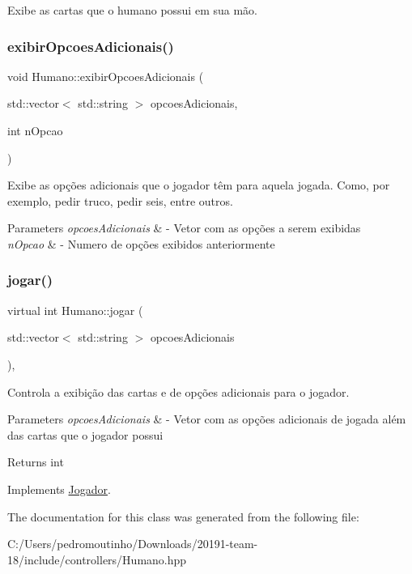 Exibe as cartas que o humano possui em sua mão. 

\mbox{\label{class_humano_a9be2c952d918117be73a00f2c538834c}} 
\subsubsection{\texorpdfstring{exibirOpcoesAdicionais()}{exibirOpcoesAdicionais()}}
{\footnotesize\ttfamily void Humano\+::exibir\+Opcoes\+Adicionais (\begin{DoxyParamCaption}\item[{std\+::vector$<$ std\+::string $>$}]{opcoes\+Adicionais,  }\item[{int}]{n\+Opcao }\end{DoxyParamCaption})}



Exibe as opções adicionais que o jogador têm para aquela jogada. Como, por exemplo, pedir truco, pedir seis, entre outros. 


\begin{DoxyParams}{Parameters}
{\em opcoes\+Adicionais} & -\/ Vetor com as opções a serem exibidas \\
\hline
{\em n\+Opcao} & -\/ Numero de opções exibidos anteriormente \\
\hline
\end{DoxyParams}
\mbox{\label{class_humano_aad706f019b99747f9c49d915f678998d}} 
\subsubsection{\texorpdfstring{jogar()}{jogar()}}
{\footnotesize\ttfamily virtual int Humano\+::jogar (\begin{DoxyParamCaption}\item[{std\+::vector$<$ std\+::string $>$}]{opcoes\+Adicionais }\end{DoxyParamCaption})\hspace{0.3cm}{\ttfamily [override]}, {\ttfamily [virtual]}}



Controla a exibição das cartas e de opções adicionais para o jogador. 


\begin{DoxyParams}{Parameters}
{\em opcoes\+Adicionais} & -\/ Vetor com as opções adicionais de jogada além das cartas que o jogador possui \\
\hline
\end{DoxyParams}
\begin{DoxyReturn}{Returns}
int 
\end{DoxyReturn}


Implements \mbox{\hyperlink{class_jogador}{Jogador}}.



The documentation for this class was generated from the following file\+:\begin{DoxyCompactItemize}
\item 
C\+:/\+Users/pedromoutinho/\+Downloads/20191-\/team-\/18/include/controllers/Humano.\+hpp\end{DoxyCompactItemize}
